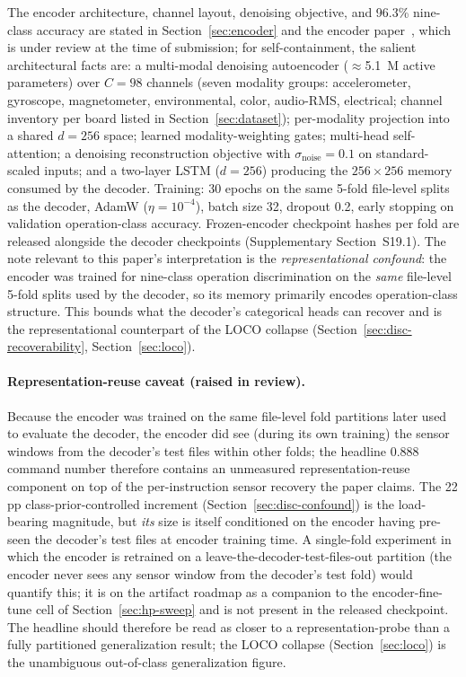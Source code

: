 \documentclass[11pt,a4paper]{article}
\begin{document}
The encoder architecture, channel layout, denoising objective, and 96.3\% nine-class accuracy are stated in Section~\ref{sec:encoder} and the encoder paper~\cite{encoder_paper}, which is under review at the time of submission; for self-containment, the salient architectural facts are: a multi-modal denoising autoencoder ($\approx$5.1~M active parameters) over $C\!=\!98$ channels (seven modality groups: accelerometer, gyroscope, magnetometer, environmental, color, audio-RMS, electrical; channel inventory per board listed in Section~\ref{sec:dataset}); per-modality projection into a shared $d\!=\!256$ space; learned modality-weighting gates; multi-head self-attention; a denoising reconstruction objective with $\sigma_{\text{noise}}\!=\!0.1$ on standard-scaled inputs; and a two-layer LSTM ($d\!=\!256$) producing the $256\!\times\!256$ memory consumed by the decoder. Training: 30 epochs on the same 5-fold file-level splits as the decoder, AdamW ($\eta\!=\!10^{-4}$), batch size 32, dropout 0.2, early stopping on validation operation-class accuracy. Frozen-encoder checkpoint hashes per fold are released alongside the decoder checkpoints (Supplementary Section~S19.1). The note relevant to this paper's interpretation is the \emph{representational confound}: the encoder was trained for nine-class operation discrimination on the \emph{same} file-level 5-fold splits used by the decoder, so its memory primarily encodes operation-class structure. This bounds what the decoder's categorical heads can recover and is the representational counterpart of the LOCO collapse (Section~\ref{sec:disc-recoverability}, Section~\ref{sec:loco}). \paragraph{Representation-reuse caveat (raised in review).} Because the encoder was trained on the same file-level fold partitions later used to evaluate the decoder, the encoder did see (during its own training) the sensor windows from the decoder's test files within other folds; the headline 0.888 command number therefore contains an unmeasured representation-reuse component on top of the per-instruction sensor recovery the paper claims. The 22 pp class-prior-controlled increment (Section~\ref{sec:disc-confound}) is the load-bearing magnitude, but \emph{its} size is itself conditioned on the encoder having pre-seen the decoder's test files at encoder training time. A single-fold experiment in which the encoder is retrained on a leave-the-decoder-test-files-out partition (the encoder never sees any sensor window from the decoder's test fold) would quantify this; it is on the artifact roadmap as a companion to the encoder-fine-tune cell of Section~\ref{sec:hp-sweep} and is not present in the released checkpoint. The headline should therefore be read as closer to a representation-probe than a fully partitioned generalization result; the LOCO collapse (Section~\ref{sec:loco}) is the unambiguous out-of-class generalization figure.
\end{document}
